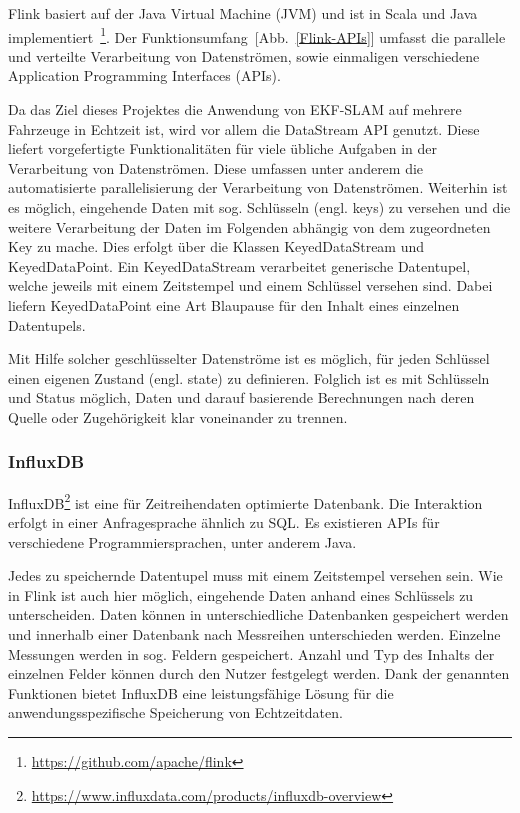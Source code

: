 \documentclass[11pt]{article}
\begin{document}
Flink basiert auf der Java Virtual Machine (JVM) und ist in Scala und Java implementiert~\footnote{\url{https://github.com/apache/flink}}. Der Funktionsumfang~[Abb.~\ref{Flink-APIs}] umfasst die parallele und verteilte Verarbeitung von Datenströmen, sowie einmaligen verschiedene Application Programming Interfaces (APIs).

Da das Ziel dieses Projektes die Anwendung von EKF-SLAM auf mehrere Fahrzeuge in Echtzeit ist, wird vor allem die DataStream API genutzt. Diese liefert vorgefertigte Funktionalitäten für viele übliche Aufgaben in der Verarbeitung von Datenströmen. Diese umfassen unter anderem die automatisierte parallelisierung der Verarbeitung von Datenströmen. Weiterhin ist es möglich, eingehende Daten mit sog. Schlüsseln (engl. keys) zu versehen und die weitere Verarbeitung der Daten im Folgenden abhängig von dem zugeordneten Key zu mache. Dies erfolgt über die Klassen KeyedDataStream und KeyedDataPoint. Ein KeyedDataStream verarbeitet generische Datentupel, welche jeweils mit einem Zeitstempel und einem Schlüssel versehen sind. Dabei liefern KeyedDataPoint eine Art Blaupause für den Inhalt eines einzelnen Datentupels.

Mit Hilfe solcher geschlüsselter Datenströme ist es möglich, für jeden Schlüssel einen eigenen Zustand (engl. state) zu definieren. Folglich ist es mit Schlüsseln und Status möglich, Daten und darauf basierende Berechnungen nach deren Quelle oder Zugehörigkeit klar voneinander zu trennen.

\subsubsection{InfluxDB}
InfluxDB\footnote{\url{https://www.influxdata.com/products/influxdb-overview}} ist eine für Zeitreihendaten optimierte Datenbank. Die Interaktion erfolgt in einer Anfragesprache ähnlich zu SQL. Es existieren APIs für verschiedene Programmiersprachen, unter anderem Java. 

Jedes zu speichernde Datentupel muss mit einem Zeitstempel versehen sein. Wie in Flink ist auch hier möglich, eingehende Daten anhand eines Schlüssels zu unterscheiden. Daten können in unterschiedliche Datenbanken gespeichert werden und innerhalb einer Datenbank nach Messreihen unterschieden werden. Einzelne Messungen werden in sog. Feldern gespeichert. Anzahl und Typ des Inhalts der einzelnen Felder können durch den Nutzer festgelegt werden. Dank der genannten Funktionen bietet InfluxDB eine leistungsfähige Lösung für die anwendungsspezifische Speicherung von Echtzeitdaten.
\end{document}
